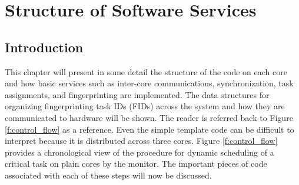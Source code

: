 \chapter{Structure of Software Services} %

\label{Chapter2} %



\section{Introduction}

This chapter will present in some detail the structure of the code on each core and how basic services such as inter-core communications, synchronization, task assignments, and fingerprinting are implemented. The data structures for organizing fingerprinting task IDs (FIDs) across the system and how they are communicated to hardware will be shown. The reader is referred back to Figure \ref{f:control_flow} as a reference. Even the simple template code can be difficult to interpret because it is distributed across three cores. Figure \ref{f:control_flow} provides a chronological view of the procedure for dynamic scheduling of a critical task on plain cores by the monitor. The important pieces of code associated with each of these steps will now be discussed.

